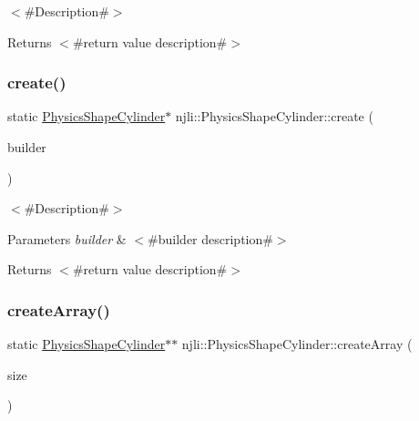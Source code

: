 $<$\#\+Description\#$>$

\begin{DoxyReturn}{Returns}
$<$\#return value description\#$>$ 
\end{DoxyReturn}
\mbox{\label{classnjli_1_1_physics_shape_cylinder_a50af85972d00bad9e0ea3cb6df4636e3}} 
\subsubsection{\texorpdfstring{create()}{create()}\hspace{0.1cm}{\footnotesize\ttfamily [2/2]}}
{\footnotesize\ttfamily static \mbox{\hyperlink{classnjli_1_1_physics_shape_cylinder}{Physics\+Shape\+Cylinder}}$\ast$ njli\+::\+Physics\+Shape\+Cylinder\+::create (\begin{DoxyParamCaption}\item[{const \mbox{\hyperlink{classnjli_1_1_physics_shape_cylinder_builder}{Physics\+Shape\+Cylinder\+Builder}} \&}]{builder }\end{DoxyParamCaption})\hspace{0.3cm}{\ttfamily [static]}}

$<$\#\+Description\#$>$


\begin{DoxyParams}{Parameters}
{\em builder} & $<$\#builder description\#$>$\\
\hline
\end{DoxyParams}
\begin{DoxyReturn}{Returns}
$<$\#return value description\#$>$ 
\end{DoxyReturn}
\mbox{\label{classnjli_1_1_physics_shape_cylinder_a85f5ae5b9a6df49f9b6235ca37fe7496}} 
\subsubsection{\texorpdfstring{create\+Array()}{createArray()}}
{\footnotesize\ttfamily static \mbox{\hyperlink{classnjli_1_1_physics_shape_cylinder}{Physics\+Shape\+Cylinder}}$\ast$$\ast$ njli\+::\+Physics\+Shape\+Cylinder\+::create\+Array (\begin{DoxyParamCaption}\item[{const \mbox{\hyperlink{_util_8h_a10e94b422ef0c20dcdec20d31a1f5049}{u32}}}]{size }\end{DoxyParamCaption})\hspace{0.3cm}{\ttfamily [static]}}

